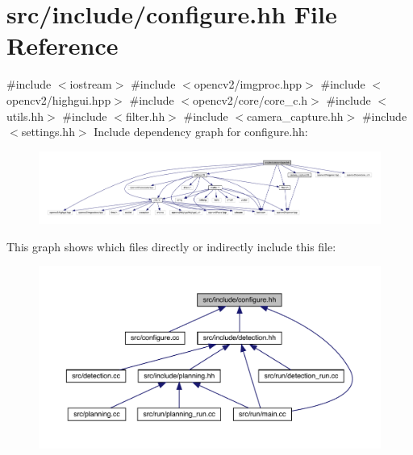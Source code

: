 \hypertarget{configure_8hh}{}\section{src/include/configure.hh File Reference}
\label{configure_8hh}
{\ttfamily \#include $<$iostream$>$}\newline
{\ttfamily \#include $<$opencv2/imgproc.\+hpp$>$}\newline
{\ttfamily \#include $<$opencv2/highgui.\+hpp$>$}\newline
{\ttfamily \#include $<$opencv2/core/core\+\_\+c.\+h$>$}\newline
{\ttfamily \#include $<$utils.\+hh$>$}\newline
{\ttfamily \#include $<$filter.\+hh$>$}\newline
{\ttfamily \#include $<$camera\+\_\+capture.\+hh$>$}\newline
{\ttfamily \#include $<$settings.\+hh$>$}\newline
Include dependency graph for configure.\+hh\+:
\nopagebreak
\begin{figure}[H]
\begin{center}
\leavevmode
\includegraphics[width=350pt]{configure_8hh__incl}
\end{center}
\end{figure}
This graph shows which files directly or indirectly include this file\+:
\nopagebreak
\begin{figure}[H]
\begin{center}
\leavevmode
\includegraphics[width=350pt]{configure_8hh__dep__incl}
\end{center}
\end{figure}
